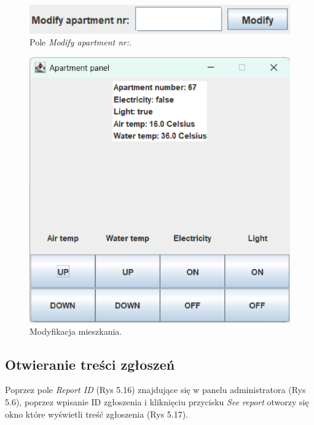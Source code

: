 \begin{figure}[H]
    \centering
    \includegraphics[width=\textwidth,height=0.15\textheight,keepaspectratio]{figures/app-images/admin-panel-modify.eps}
    \caption{Pole \textit{Modify apartment nr:}.\label{fig19}}
\end{figure}

\begin{figure}[H]
    \centering
    \includegraphics[width=\textwidth,height=0.3\textheight,keepaspectratio]{figures/app-images/modify-apartment.eps}
    \caption{Modyfikacja mieszkania.\label{fig20}}
\end{figure}

\newpage
\subsection{Otwieranie treści zgłoszeń}
Poprzez pole \textit{Report ID} (Rys 5.16) znajdujące się w panelu administratora (Rys 5.6), poprzez wpisanie ID zgłoszenia 
i kliknięciu przycisku \textit{See report} otworzy się okno które wyświetli treść zgłoszenia (Rys 5.17).

